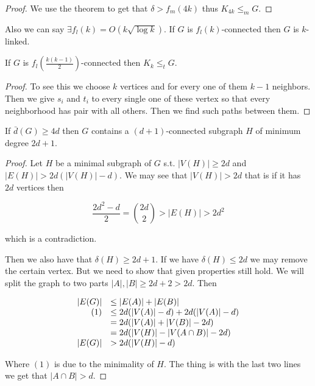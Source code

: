 \begin{proof}
	We use the theorem to get that $\delta > f_{m}(4k)$ thus $K_{4k} \leq_{m} G$.
\end{proof}

Also we can say $\exists f_{l}(k) = O(k \sqrt{\log k})$. If $G$ is $f_{l}(k)$-connected then $G$ is $k$-linked.

\begin{cor}
	If $G$ is $f_{l}\left( \frac{k (k-1)}{2}\right)$-connected then $K_{k} \leq_{t} G$.
\end{cor}

\begin{proof}
	To see this we choose $k$ vertices and for every one of them $k-1$ neighbors. Then we give $s_{i}$ and $t_{i}$ to every single one of these vertex so that every neighborhood has pair with all others. Then we find such paths between them.
\end{proof}

\begin{lemma}
	If $\bar{d}(G) \geq 4d$ then $G$ contains a $(d+1)$-connected subgraph $H$ of minimum degree $2d+1$.
\end{lemma}

\begin{proof}
	Let $H$ be a minimal subgraph of $G$ s.t. $|V(H)| \geq 2d$ and $|E(H)| > 2d (|V(H)| - d)$. We may see that $|V(H)| > 2d$ that is if it has $2d$ vertices then
	
	$$
	\frac{2d^{2} - d}{2} = \binom{2d}{2} > |E(H)| > 2d^{2}
	$$
	
	which is a contradiction.
	
	Then we also have that $\delta (H) \geq 2d+1$. If we have $\delta(H) \leq 2d$ we may remove the certain vertex. But we need to show that given properties still hold. We will split the graph to two parts $|A|, |B| \geq 2d+2 > 2d$. Then
	
	$$
	\begin{array}{r l}
		|E(G)| & \leq |E(A)| + |E(B)| \\
		(1) & \leq 2d(|V(A)| - d) + 2d(|V(A)| - d) \\
		& = 2d(|V(A)| + |V(B)| - 2d) \\
		& = 2d(|V(H)| - |V(A \cap B)| - 2d) \\
		|E(G)| & > 2d(|V(H)| - d)
	\end{array}
	$$
	
	Where $(1)$ is due to the minimality of $H$. The thing is with the last two lines we get that $|A \cap B| > d$.
\end{proof}

